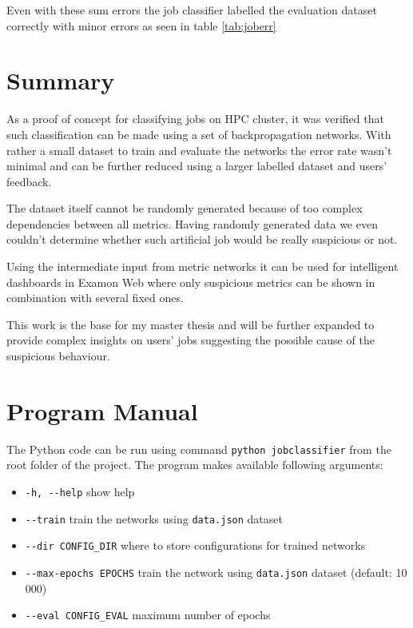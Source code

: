 \documentclass[11pt,a4paper]{article}
\begin{document}
Even with these sum errors the job classifier labelled the evaluation dataset correctly with minor errors as seen in table \ref{tab:joberr}

\section{Summary}
\label{sec:sum}

As a proof of concept for classifying jobs on HPC cluster, it was verified that such classification can be made using a set of backpropagation networks. With rather a small dataset to train and evaluate the networks the error rate wasn't minimal and can be further reduced using a larger labelled dataset and users' feedback.

The dataset itself cannot be randomly generated because of too complex dependencies between all metrics. Having randomly generated data we even couldn't determine whether such artificial job would be really suspicious or not.

Using the intermediate input from metric networks it can be used for intelligent dashboards in Examon Web where only suspicious metrics can be shown in combination with several fixed ones.

This work is the base for my master thesis and will be further expanded to provide complex insights on users' jobs suggesting the possible cause of the suspicious behaviour.

\section{Program Manual}

The Python code can be run using command \texttt{python jobclassifier} from the root folder of the project. The program makes available following arguments:
\begin{itemize}
    \item \texttt{-h, -{}-help} show help
    \item \texttt{-{}-train} train the networks using \texttt{data.json} dataset
    \item \texttt{-{}-dir CONFIG\_DIR} where to store configurations for trained networks
    \item \texttt{-{}-max-epochs EPOCHS} train the network using \texttt{data.json} dataset (default: 10 000)
    \item \texttt{-{}-eval CONFIG\_EVAL} maximum number of epochs
\end{itemize}
\end{document}
